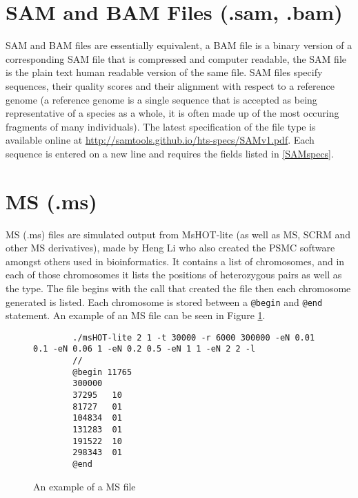 \documentclass[a4]{article}
\begin{document}
\section{SAM and BAM Files (.sam, .bam)}
	SAM and BAM files are essentially equivalent, a BAM file is a binary version of a corresponding SAM file that is compressed and computer readable, the SAM file is the plain text human readable version of the same file. SAM files specify sequences, their quality scores and their alignment with respect to a reference genome (a reference genome is a single sequence that is accepted as being representative of a species as a whole, it is often made up of the most occuring fragments of many individuals). The latest specification of the file type is available online at \url{http://samtools.github.io/hts-specs/SAMv1.pdf}. Each sequence is entered on a new line and requires the fields listed in \ref{SAMspecs}.
	

\section{MS (.ms)}
	MS (.ms) files are simulated output from MsHOT-lite (as well as MS, SCRM and other MS derivatives), made by Heng Li who also created the PSMC software amongst others used in bioinformatics. It contains a list of chromosomes, and in each of those chromosomes it lists the positions of heterozygous pairs as well as the type. The file begins with the call that created the file then each chromosome generated is listed. Each chromosome is stored between a \verb|@begin| and \verb|@end| statement. An example of an MS file can be seen in Figure \ref{msFile}.
	\begin{figure}[h]
		\begin{lstlisting}
		./msHOT-lite 2 1 -t 30000 -r 6000 300000 -eN 0.01 0.1 -eN 0.06 1 -eN 0.2 0.5 -eN 1 1 -eN 2 2 -l 
		//
		@begin 11765
		300000
		37295	10
		81727	01
		104834	01
		131283	01
		191522	10
		298343	01
		@end
		\end{lstlisting}
		\caption{An example of a MS file}
		\label{msFile}
	\end{figure}
\end{document}
